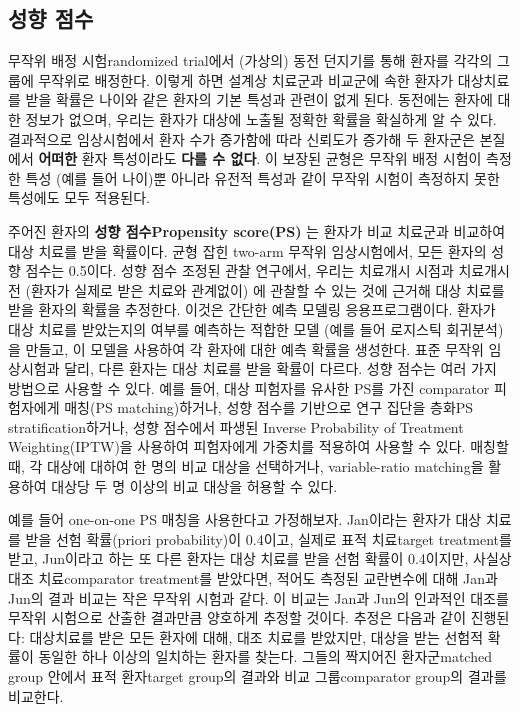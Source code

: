 \documentclass[10.5pt]{book}
\theoremstyle{definition}
\theoremstyle{definition}
\theoremstyle{definition}
\theoremstyle{remark}
\begin{document}
\subsection{성향 점수}\label{-}


무작위 배정 시험randomized trial에서 (가상의) 동전 던지기를 통해 환자를
각각의 그룹에 무작위로 배정한다. 이렇게 하면 설계상 치료군과 비교군에
속한 환자가 대상치료를 받을 확률은 나이와 같은 환자의 기본 특성과 관련이
없게 된다. 동전에는 환자에 대한 정보가 없으며, 우리는 환자가 대상에
노출될 정확한 확률을 확실하게 알 수 있다. 결과적으로 임상시험에서 환자
수가 증가함에 따라 신뢰도가 증가해 두 환자군은 본질에서 \textbf{어떠한}
환자 특성이라도 \textbf{다를 수 없다}. 이 보장된 균형은 무작위 배정
시험이 측정한 특성 (예를 들어 나이)뿐 아니라 유전적 특성과 같이 무작위
시험이 측정하지 못한 특성에도 모두 적용된다. 

주어진 환자의 \textbf{성향 점수Propensity score(PS)} 는 환자가 비교
치료군과 비교하여 대상 치료를 받을 확률이다. \citep{rosenbaum_1983} 균형
잡힌 two-arm 무작위 임상시험에서, 모든 환자의 성향 점수는 0.5이다. 성향
점수 조정된 관찰 연구에서, 우리는 치료개시 시점과 치료개시 전 (환자가
실제로 받은 치료와 관계없이) 에 관찰할 수 있는 것에 근거해 대상 치료를
받을 환자의 확률을 추정한다. 이것은 간단한 예측 모델링 응용프로그램이다.
환자가 대상 치료를 받았는지의 여부를 예측하는 적합한 모델 (예를 들어
로지스틱 회귀분석)을 만들고, 이 모델을 사용하여 각 환자에 대한 예측
확률을 생성한다. 표준 무작위 임상시험과 달리, 다른 환자는 대상 치료를
받을 확률이 다르다. 성향 점수는 여러 가지 방법으로 사용할 수 있다. 예를
들어, 대상 피험자를 유사한 PS를 가진 comparator 피험자에게 매칭(PS
matching)하거나, 성향 점수를 기반으로 연구 집단을 층화PS
stratification하거나, 성향 점수에서 파생된 Inverse Probability of
Treatment Weighting(IPTW)을 사용하여 피험자에게 가중치를 적용하여 사용할
수 있다. 매칭할 때, 각 대상에 대하여 한 명의 비교 대상을 선택하거나,
variable-ratio matching을 활용하여 대상당 두 명 이상의 비교 대상을
허용할 수 있다. \citep{rassen_2012} 

예를 들어 one-on-one PS 매칭을 사용한다고 가정해보자. Jan이라는 환자가
대상 치료를 받을 선험 확률(priori probability)이 0.4이고, 실제로 표적
치료target treatment를 받고, Jun이라고 하는 또 다른 환자는 대상 치료를
받을 선험 확률이 0.4이지만, 사실상 대조 치료comparator treatment를
받았다면, 적어도 측정된 교란변수에 대해 Jan과 Jun의 결과 비교는 작은
무작위 시험과 같다. 이 비교는 Jan과 Jun의 인과적인 대조를 무작위
시험으로 산출한 결과만큼 양호하게 추정할 것이다. 추정은 다음과 같이
진행된다: 대상치료를 받은 모든 환자에 대해, 대조 치료를 받았지만, 대상을
받는 선험적 확률이 동일한 하나 이상의 일치하는 환자를 찾는다. 그들의
짝지어진 환자군matched group 안에서 표적 환자target group의 결과와 비교
그룹comparator group의 결과를 비교한다.
\end{document}
